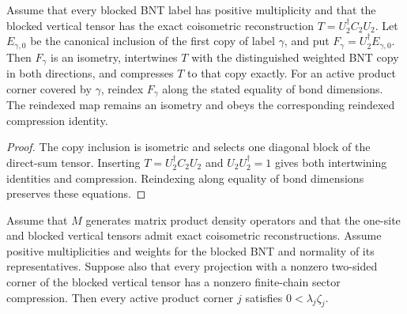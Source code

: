 \begin{lemma}
    \label{thm:mpdo_blocked_reference_corners}
    \leanok
    Assume that every blocked BNT label has positive multiplicity and that the
    blocked vertical tensor has the exact coisometric reconstruction
    $T=U_2^\dagger C_2U_2$. Let $E_{\gamma,0}$ be the canonical inclusion of
    the first copy of label $\gamma$, and put
    $F_\gamma=U_2^\dagger E_{\gamma,0}$. Then $F_\gamma$ is an isometry,
    intertwines $T$ with the distinguished weighted BNT copy in both
    directions, and compresses $T$ to that copy exactly. For an active
    product corner covered by $\gamma$, reindex $F_\gamma$ along the stated
    equality of bond dimensions. The reindexed map remains an isometry and
    obeys the corresponding reindexed compression identity.
\end{lemma}

\begin{proof}\leanok
    The copy inclusion is isometric and selects one diagonal block of the
    direct-sum tensor. Inserting $T=U_2^\dagger C_2U_2$ and
    $U_2U_2^\dagger=1$ gives both intertwining identities and compression.
    Reindexing along equality of bond dimensions preserves these equations.
\end{proof}

\begin{lemma}
    \label{thm:mpdo_active_product_coefficient_phase_pos_of_sector_separation}
    \leanok
    Assume that $M$ generates matrix product density operators and that the
    one-site and blocked vertical tensors admit exact coisometric
    reconstructions. Assume positive multiplicities and weights for the
    blocked BNT and normality of its representatives. Suppose also that
    every projection with a nonzero two-sided corner of the blocked vertical tensor
    has a nonzero finite-chain sector compression. Then every active product
    corner $j$ satisfies $0<\lambda_j\zeta_j$.
\end{lemma}

